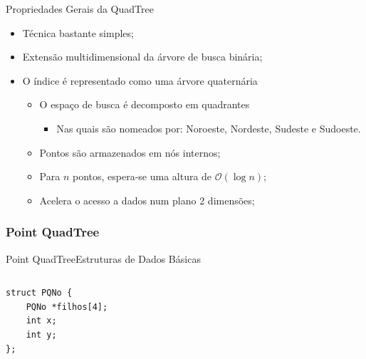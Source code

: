 \documentclass[red, tikz, aspectratio=169, xcolor=dvipsnames]{beamer}
\let\olditem=\item%
\renewcommand{\item}{\olditem \justifying}
\begin{document}
		\begin{frame}{Propriedades Gerais da QuadTree}
			\begin{itemize}
				\setlength{\itemsep}{1.3em}
				\item Técnica bastante simples;
				\item Extensão multidimensional da árvore de busca binária;
				\item O índice é representado como uma árvore quaternária
				\begin{itemize}
					\setlength{\itemsep}{0.8em}
					\item O espaço de busca é decomposto em quadrantes
					\begin{itemize}
						\item Nas quais são nomeados por: Noroeste, Nordeste, Sudeste e Sudoeste.
					\end{itemize}
				
					\item Pontos são armazenados em nós internos;
					\item Para $n$ pontos, espera-se uma altura de $\mathcal{O}(\log n)$;
					\item Acelera o acesso a dados num plano 2 dimensões;
				\end{itemize}
			\end{itemize}
		\end{frame}



		\subsubsection{Point QuadTree}
		
			\begin{frame}[fragile]{Point QuadTree}{Estruturas de Dados Básicas}
				\begin{columns}
					\begin{column}{0.48\textwidth}
						\centering
						\begin{verbatim}
struct PQNo {
	PQNo *filhos[4];
	int x;
	int y;
};
						\end{verbatim}
					\end{column}
					\begin{column}{0.5\textwidth}
						\centering
						\fbox{
							\begin{forest}
								[\texttt{(x,y)}
								[NO]
								[NE]
								[SO]
								[SE]
								]
						\end{forest}}
					\end{column}
				\end{columns}
			\end{frame}
\end{document}
